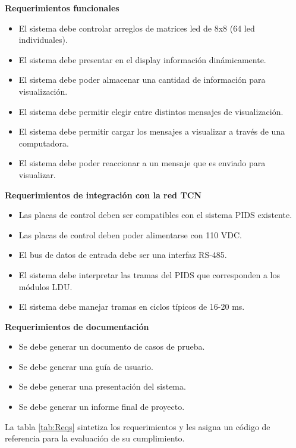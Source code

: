 \textbf{Requerimientos funcionales}

\begin{itemize}
\item El sistema debe controlar arreglos de matrices led de 8x8 (64 led individuales).
\item El sistema debe presentar en el display información dinámicamente.
\item El sistema debe poder almacenar una cantidad de información para visualización.
\item El sistema debe permitir elegir entre distintos mensajes de visualización.
\item El sistema debe permitir cargar los mensajes a visualizar a través de una computadora.
\item El sistema debe poder reaccionar a un mensaje que es enviado para visualizar.
\end{itemize}

\textbf{Requerimientos de integración con la red TCN
}\begin{itemize}
\item Las placas de control deben ser compatibles con el sistema PIDS existente.
\item Las placas de control deben poder alimentarse con 110 VDC.
\item El bus de datos de entrada debe ser una interfaz RS-485.
\item El sistema debe interpretar las tramas del PIDS que corresponden a los módulos LDU.
\item El sistema debe manejar tramas en ciclos típicos de 16-20 ms.
\end{itemize}

\textbf{Requerimientos de documentación
}\begin{itemize}
\item Se debe generar un documento de casos de prueba.
\item Se debe generar una guía de usuario.
\item Se debe generar una presentación del sistema.
\item Se debe generar un informe final de proyecto.
\end{itemize}

La tabla \ref{tab:Reqs} sintetiza los requerimientos y les asigna un código de referencia para la evaluación de su cumplimiento.
	
